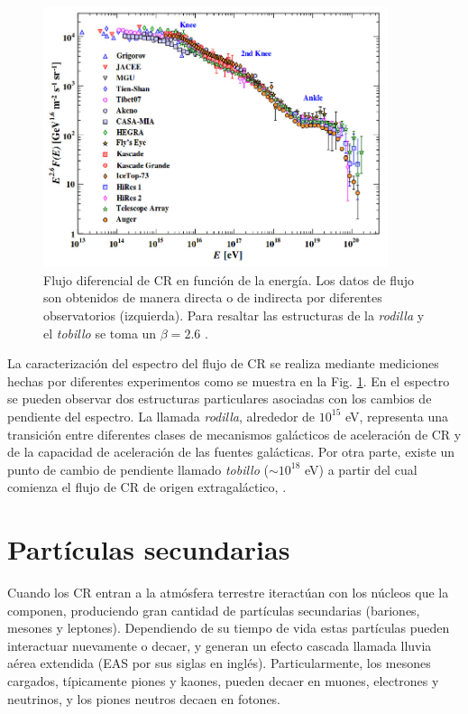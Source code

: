 \begin{figure}[h!]
\begin{center}
\includegraphics[width=0.9\textwidth]{Figures/Flux}
\caption[Flujo diferencial de CR en función de la energía.]{Flujo diferencial de CR en función de la energía. Los datos de flujo son obtenidos de manera directa o de indirecta por diferentes observatorios (izquierda). Para resaltar las estructuras de la \textit{rodilla} y el \textit{tobillo} se toma un $\beta = 2.6$ \cite{Spurio2015}.}
\label{Flux}
\end{center}
\end{figure}

La caracterización del espectro del flujo de CR se realiza mediante mediciones hechas por diferentes experimentos como se muestra en la Fig. \ref{Flux}. En el espectro se pueden observar dos estructuras particulares asociadas con los cambios de pendiente del espectro. La llamada \textit{rodilla}, alrededor de $10^{15}$ eV, representa una transición entre diferentes clases de mecanismos galácticos de aceleración de CR y de la capacidad de aceleración de las fuentes galácticas. Por otra parte, existe un punto de cambio de pendiente llamado \textit{tobillo} ($\sim 10^{18}$ eV) a partir del cual comienza el flujo de CR de origen extragaláctico, \cite{Spurio2015}.

\section{Partículas secundarias}

Cuando los CR entran a la atmósfera terrestre iteractúan con los núcleos que la componen, produciendo gran cantidad de partículas secundarias (bariones, mesones y leptones). Dependiendo de su tiempo de vida estas partículas pueden interactuar nuevamente o decaer, y generan un efecto cascada llamada lluvia aérea extendida (EAS por sus siglas en inglés). Particularmente, los mesones cargados, típicamente piones y kaones, pueden decaer en muones, electrones y neutrinos, y los piones neutros decaen en fotones.

